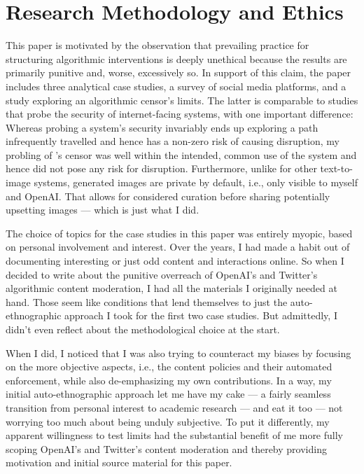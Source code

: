 
\newpage
\section{Research Methodology and Ethics}
\label{adx:research-ethics}

This paper is motivated by the observation that prevailing practice for
structuring algorithmic interventions is deeply unethical because the results
are primarily punitive and, worse, excessively so. In support of this claim, the
paper includes three analytical case studies, a survey of social media
platforms, and a study exploring an algorithmic censor's limits. The latter is
comparable to studies that probe the security of internet-facing systems, with
one important difference: Whereas probing a system's security invariably ends up
exploring a path infrequently travelled and hence has a non-zero risk of causing
disruption, my probling of \DALLE's censor was well within the intended, common
use of the system and hence did not pose any risk for disruption. Furthermore,
unlike for other text-to-image systems, generated images are private by default,
i.e., only visible to myself and OpenAI. That allows for considered curation
before sharing potentially upsetting images --- which is just what I did.

The choice of topics for the case studies in this paper was entirely myopic,
based on personal involvement and interest. Over the years, I had made a habit
out of documenting interesting or just odd content and interactions online. So
when I decided to write about the punitive overreach of OpenAI's and Twitter's
algorithmic content moderation, I had all the materials I originally needed at
hand. Those seem like conditions that lend themselves to just the
auto-ethnographic approach I took for the first two case studies. But admittedly,
I didn't even reflect about the methodological choice at the start.

When I did, I noticed that I was also trying to counteract my biases by focusing
on the more objective aspects, i.e., the content policies and their automated
enforcement, while also de-emphasizing my own contributions. In a way, my
initial auto-ethnographic approach let me have my cake --- a fairly seamless
transition from personal interest to academic research --- and eat it too ---
not worrying too much about being unduly subjective. To put it differently, my
apparent willingness to test limits had the substantial benefit of me more fully
scoping OpenAI's and Twitter's content moderation and thereby providing
motivation and initial source material for this paper.


